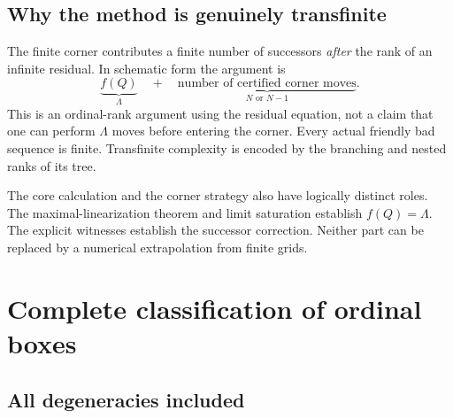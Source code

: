 \documentclass[11pt,letterpaper]{article}
\theoremstyle{definition}
\theoremstyle{remark}
\begin{document}
\subsection{Why the method is genuinely transfinite}
The finite corner contributes a finite number of successors \emph{after}
the rank of an infinite residual. In schematic form the argument is
\[
 \underbrace{f(Q)}_{\Lambda}
 \quad+\quad
 \underbrace{\text{number of certified corner moves}}_{N\text{ or }N-1}.
\]
This is an ordinal-rank argument using the residual equation, not a claim
that one can perform $\Lambda$ moves before entering the corner. Every
actual friendly bad sequence is finite. Transfinite complexity is encoded
by the branching and nested ranks of its tree.

The core calculation and the corner strategy also have logically distinct
roles. The maximal-linearization theorem and limit saturation establish
$f(Q)=\Lambda$. The explicit witnesses establish the successor correction.
Neither part can be replaced by a numerical extrapolation from finite
grids.

\section{Complete classification of ordinal boxes}\label{sec:boxes}

\subsection{All degeneracies included}
\end{document}

